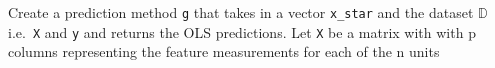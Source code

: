 \documentclass[
]{article}
\newenvironment{Shaded}{\begin{snugshade}}{\end{snugshade}}
\newcommand{\CommentTok}[1]{\textcolor[rgb]{0.56,0.35,0.01}{\textit{#1}}}
\newcommand{\ControlFlowTok}[1]{\textcolor[rgb]{0.13,0.29,0.53}{\textbf{#1}}}
\newcommand{\DecValTok}[1]{\textcolor[rgb]{0.00,0.00,0.81}{#1}}
\newcommand{\FunctionTok}[1]{\textcolor[rgb]{0.00,0.00,0.00}{#1}}
\newcommand{\NormalTok}[1]{#1}
\newcommand{\OtherTok}[1]{\textcolor[rgb]{0.56,0.35,0.01}{#1}}
\newcommand{\SpecialCharTok}[1]{\textcolor[rgb]{0.00,0.00,0.00}{#1}}
\begin{document}
Create a prediction method \texttt{g} that takes in a vector
\texttt{x\_star} and the dataset \(\mathbb{D}\) i.e.~\texttt{X} and
\texttt{y} and returns the OLS predictions. Let \texttt{X} be a matrix
with with p columns representing the feature measurements for each of
the n units

\begin{Shaded}
\end{Shaded}
\end{document}
